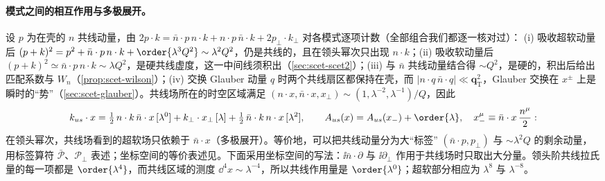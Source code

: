 \paragraph{模式之间的相互作用与多极展开。}
设 $p$ 为在壳的 $n$ 共线动量，由 $2p\cdot k=\bar n\cdot p\,n\cdot k+n\cdot p\,\bar n\cdot k+2p_\perp\cdot k_\perp$ 对各模式逐项计数（全部组合我们都逐一核对过）：%
(i) 吸收超软动量后 $(p+k)^2=p^2+\bar n\cdot p\,n\cdot k+\order{\lambda^3Q^2}\sim\lambda^2Q^2$，仍是共线的，且在领头幂次只出现 $n\cdot k$；(ii) 吸收软动量后 $(p+k)^2\simeq\bar n\cdot p\,n\cdot k\sim\lambda Q^2$，是硬共线虚度，这一中间线须积出（\cref{sec:scet-scet2}）；(iii) 与 $\bar n$ 共线动量结合得 $\sim Q^2$，是硬的，积出后给出匹配系数与 $W_n$（\cref{prop:scet-wilson}）；(iv) 交换 Glauber 动量 $q$ 时两个共线扇区都保持在壳，而 $|n\cdot q\,\bar n\cdot q|\ll\bm q_{\mathrm T}^2$，Glauber 交换在 $x^\pm$ 上是瞬时的“势”（\cref{sec:scet-glauber}）。共线场所在的时空区域满足 $(n\cdot x,\bar n\cdot x,x_\perp)\sim(1,\lambda^{-2},\lambda^{-1})/Q$，因此
\begin{equation}\label{eq:scet-multipole}
k_{us}\cdot x=\tfrac12\,n\cdot k\,\bar n\cdot x\,[\lambda^0]+k_\perp\cdot x_\perp\,[\lambda]+\tfrac12\,\bar n\cdot k\,n\cdot x\,[\lambda^2],\qquad
A_{us}(x)=A_{us}(x_-)+\order{\lambda},\quad x_-^\mu\equiv\bar n\cdot x\,\frac{n^\mu}{2}:
\end{equation}
在领头幂次，共线场看到的超软场只依赖于 $\bar n\cdot x$（多极展开）。等价地，可以把共线动量分为大“标签” $(\bar n\cdot p,p_\perp)$ 与 $\sim\lambda^2Q$ 的剩余动量，用标签算符 $\bar{\mathcal P}$、$\mathcal P_\perp$ 表述\cite{BauerEtAl2001,BauerStewart2001}；坐标空间的等价表述见\cite{BenekeEtAl2002,Beneke:2002ni}。下面采用坐标空间的写法：$\ii\bar n\cdot\partial$ 与 $\ii\partial_\perp$ 作用于共线场时只取出大分量。领头阶共线拉氏量的每一项都是 $\order{\lambda^4}$，而共线区域的测度 $\dd^4x\sim\lambda^{-4}$，所以共线作用量是 $\order{\lambda^0}$；超软部分相应为 $\lambda^8$ 与 $\lambda^{-8}$。

